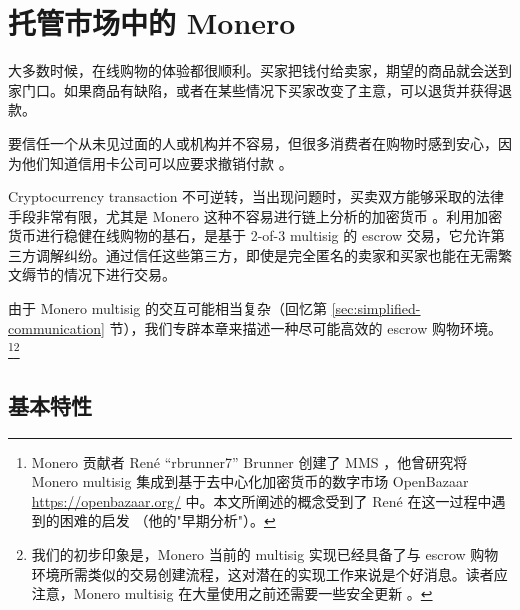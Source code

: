 \chapter{托管市场中的 Monero}
\label{chapter:escrowed-market}

大多数时候，在线购物的体验都很顺利。买家把钱付给卖家，期望的商品就会送到家门口。如果商品有缺陷，或者在某些情况下买家改变了主意，可以退货并获得退款。

要信任一个从未见过面的人或机构并不容易，但很多消费者在购物时感到安心，因为他们知道信用卡公司可以应要求撤销付款 \cite{credit-card-reversals}。

Cryptocurrency transaction 不可逆转，当出现问题时，买卖双方能够采取的法律手段非常有限，尤其是 Monero 这种不容易进行链上分析的加密货币 \cite{chainalysis-2020-report}。利用加密货币进行稳健在线购物的基石，是基于 2-of-3 multisig 的 escrow 交易，它允许第三方调解纠纷。通过信任这些第三方，即使是完全匿名的卖家和买家也能在无需繁文缛节的情况下进行交易。

由于 Monero multisig 的交互可能相当复杂（回忆第 \ref{sec:simplified-communication} 节），我们专辟本章来描述一种尽可能高效的 escrow 购物环境。\footnote{Monero 贡献者 Ren\'e ``rbrunner7'' Brunner 创建了 MMS \cite{mms-project-proposal, mms-manual}，他曾研究将 Monero multisig 集成到基于去中心化加密货币的数字市场 OpenBazaar \url{https://openbazaar.org/} 中。本文所阐述的概念受到了 Ren\'e 在这一过程中遇到的困难的启发 \cite{openbazaar-rbrunner-investigation}（他的"早期分析"）。}\footnote{我们的初步印象是，Monero 当前的 multisig 实现已经具备了与 escrow 购物环境所需类似的交易创建流程，这对潜在的实现工作来说是个好消息。读者应注意，Monero multisig 在大量使用之前还需要一些安全更新 \cite{multisig-research-issue-67}。}



\section{基本特性}
\label{sec:escrowed-marketplace-essential-features}

